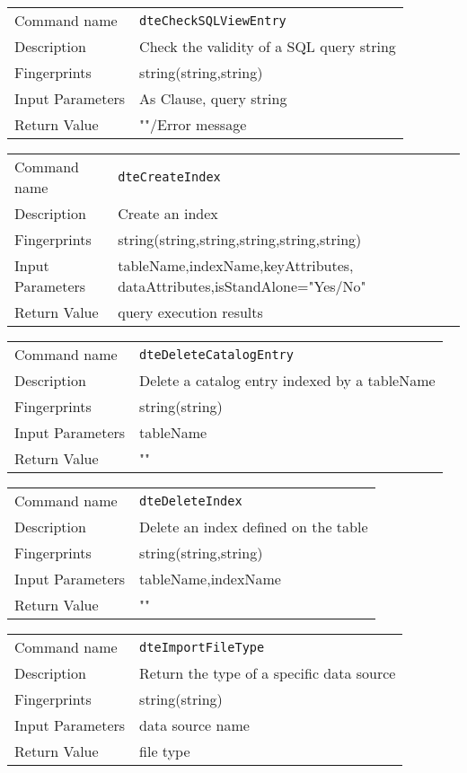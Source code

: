 \noindent
\begin{tabular}{l|p{5in}}
\hline
Command name &{\tt dteCheckSQLViewEntry }\\ 
Description &
Check the validity of a SQL query string
 	\\
Fingerprints & string(string,string)\\
Input Parameters&As Clause, query string\\
Return Value&""/Error message\\
\hline
\end{tabular}
\bigskip

\noindent
\begin{tabular}{l|p{5in}}
\hline
Command name &{\tt dteCreateIndex }\\ 
Description &
Create an index 
 	\\
Fingerprints & string(string,string,string,string,string)\\
Input Parameters&tableName,indexName,keyAttributes, dataAttributes,isStandAlone="Yes/No"\\
Return Value&query execution results\\
\hline
\end{tabular}
\bigskip

\noindent
\begin{tabular}{l|p{5in}}
\hline
Command name &{\tt dteDeleteCatalogEntry }\\ 
Description &
Delete a catalog entry indexed by a tableName
 	\\
Fingerprints & string(string)\\
Input Parameters&tableName\\
Return Value&""\\
\hline
\end{tabular}
\bigskip

\noindent
\begin{tabular}{l|p{5in}}
\hline
Command name &{\tt dteDeleteIndex }\\ 
Description &
Delete an index defined on the table
 	\\
Fingerprints & string(string,string)\\
Input Parameters&tableName,indexName\\
Return Value&""\\
\hline
\end{tabular}
\bigskip

\noindent
\begin{tabular}{l|p{5in}}
\hline
Command name &{\tt dteImportFileType }\\ 
Description &
Return the type of a specific data source
 	\\
Fingerprints & string(string)\\
Input Parameters&data source name\\
Return Value&file type\\
\hline
\end{tabular}
\bigskip

